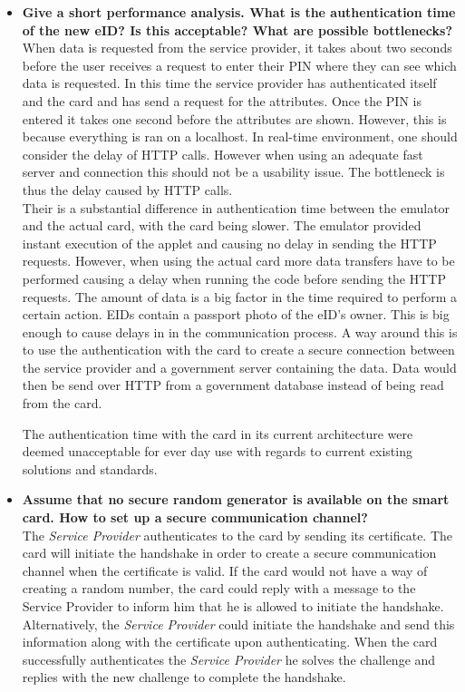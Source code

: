 \documentclass[12pt]{report}
\begin{document}
\begin{itemize}
\item \textbf{Give a short performance analysis. What is the authentication time of the new eID? Is this acceptable? What are possible bottlenecks?}\\
When data is requested from the service provider, it takes about two seconds before the user receives a request to enter their PIN where they can see which data is requested. In this time the service provider has authenticated itself and the card and has send a request for the attributes. Once the PIN is entered it takes one second before the attributes are shown. However, this is because everything is ran on a localhost. In real-time environment, one should consider the delay of HTTP calls. However when using an adequate fast server and connection this should not be a usability issue. The bottleneck is thus the delay caused by HTTP calls.\\

Their is a substantial difference in authentication time between the emulator and the actual card, with the card being slower. The emulator provided instant execution of the applet and causing no delay in sending the HTTP requests. However, when using the actual card more data transfers have to be performed causing a delay when running the code before sending the HTTP requests. The amount of data is a big factor in the time required to perform a certain action. EIDs contain a passport photo of the eID's owner. This is big enough to cause delays in in the communication process. A way around this is to use the authentication with the card to create a secure connection between the service provider and a government server containing the data. Data would then be send over HTTP from a government database instead of being read from the card.

The authentication time with the card in its current architecture were deemed unacceptable for ever day use with regards to current existing solutions and standards.

\item \textbf{Assume that no secure random generator is available on the smart card. How to set up a secure communication channel?}\\
The \textit{Service Provider} authenticates to the card by sending its certificate. The card will initiate the handshake in order to create a secure communication channel when the certificate is valid. If the card would not have a  way of creating a random number, the card could reply with a message to the Service Provider to inform him that he is allowed to initiate the handshake. Alternatively, the \textit{Service Provider} could initiate the handshake and send this information along with the certificate upon authenticating. When the card successfully authenticates the \textit{Service Provider} he solves the challenge and replies with the new challenge to complete the handshake.


\end{itemize}
\end{document}
